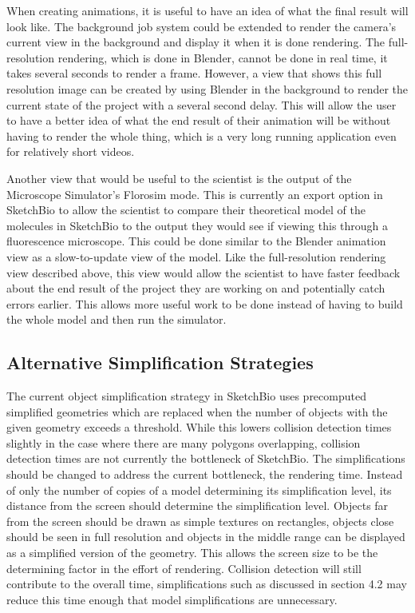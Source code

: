\documentclass{article} %
\begin{document}
When creating animations, it is useful to have an idea of what the final result will look like.  The background job system could be extended to render the camera's current view in the background and display it when it is done rendering.  The full-resolution rendering, which is done in Blender, cannot be done in real time, it takes several seconds to render a frame.  However, a view that shows this full resolution image can be created by using Blender in the background to render the current state of the project with a several second delay.  This will allow the user to have a better idea of what the end result of their animation will be without having to render the whole thing, which is a very long running application even for relatively short videos.

Another view that would be useful to the scientist is the output of the Microscope Simulator's Florosim mode.  This is currently an export option in SketchBio to allow the scientist to compare their theoretical model of the molecules in SketchBio to the output they would see if viewing this through a fluorescence microscope.  This could be done similar to the Blender animation view as a slow-to-update view of the model.  Like the full-resolution rendering view described above, this view would allow the scientist to have faster feedback about the end result of the project they are working on and potentially catch errors earlier.  This allows more useful work to be done instead of having to build the whole model and then run the simulator.

\subsection{Alternative Simplification Strategies}
\label{sec:simplification_strategies}
The current object simplification strategy in SketchBio uses precomputed simplified geometries which are replaced when the number of objects with the given geometry exceeds a threshold.  While this lowers collision detection times slightly in the case where there are many polygons overlapping, collision detection times are not currently the bottleneck of SketchBio.  The simplifications should be changed to address the current bottleneck, the rendering time.  Instead of only the number of copies of a model determining its simplification level, its distance from the screen should determine the simplification level.  Objects far from the screen should be drawn as simple textures on rectangles, objects close should be seen in full resolution and objects in the middle range can be displayed as a simplified version of the geometry.  This allows the screen size to be the determining factor in the effort of rendering.  Collision detection will still contribute to the overall time, simplifications such as discussed in section 4.2 may reduce this time enough that model simplifications are unnecessary.
\end{document}
